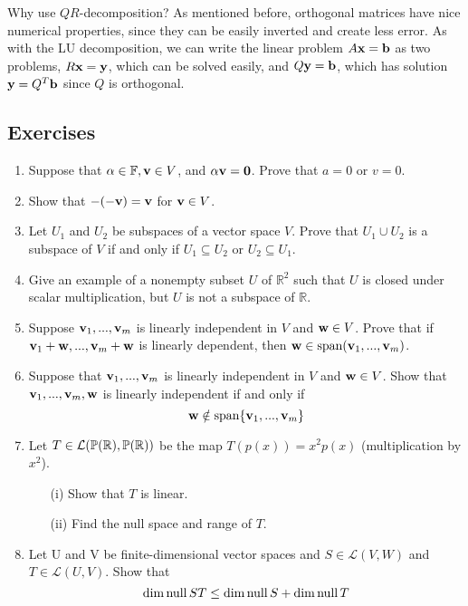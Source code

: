 \documentclass{article}
\begin{document}
Why use $QR$-decomposition? As mentioned before, orthogonal matrices have nice numerical properties, since they can be easily inverted and create less error. As with the LU decomposition, we can write the linear problem $A {\mathbf{x}} =\mathbf{b}$ as two problems, $R {\mathbf{x}} = {\mathbf{y}}$, which can be solved easily, and $Q {\mathbf{y}} = \mathbf{b}$, which has solution ${\mathbf{y}} = Q^T \mathbf{b}$ since $Q$ is orthogonal.

\subsection{Exercises}

\begin{enumerate}
\item Suppose that $\alpha\in{\mathbb{F}}, {\mathbf{v}}\in V$, and $\alpha {\mathbf{v}}={\mathbf{0}}$. Prove that $a=0$
or $v=0$.
\item Show that $-(-{\mathbf{v}})={\mathbf{v}}$ for ${\mathbf{v}}\in V$.
\item Let $U_1$ and $U_2$ be subspaces of a vector space $V$. Prove that $U_1 \cup U_2$ is a subspace of $V$ if and only if $U_1 \subseteq U_2$ or $U_2 \subseteq U_1$.
\item Give an example of a nonempty subset $U$ of $\mathbb{R}^{2}$ such that $U$ is closed under scalar
multiplication, but $U$ is not a subspace of $\mathbb{R}$.
 \item Suppose ${\mathbf{v}}_{1},...,{\mathbf{v}}_{m}$ is linearly independent in $V$
and ${\mathbf{w}}\in V$. Prove that if ${\mathbf{v}}_{1}+{\mathbf{w}},...,{\mathbf{v}}_{m}+{\mathbf{w}}$ is linearly dependent,
then ${\mathbf{w}}\in\text{span}({\mathbf{v}}_{1},...,{\mathbf{v}}_{m})$. 
\item Suppose that ${\mathbf{v}}_{1},...,{\mathbf{v}}_{m}$ is linearly independent
in $V$ and ${\mathbf{w}}\in V$. Show that ${\mathbf{v}}_{1},...,{\mathbf{v}}_{m},{\mathbf{w}}$ is linearly independent if and only if 
$${\mathbf{w}}\notin\text{span}\{{\mathbf{v}}_{1},...,{\mathbf{v}}_{m}\}$$
\item Let $T \in {\mathcal{L}}(\mathbb{P}({\mathbb{R}}),\mathbb{P}({\mathbb{R}}))$ be the map $T (p(x))= x^2 p(x)$ (multiplication by $x^2$). 
\begin{enumerate}
    \item[(i)] Show that $T$ is linear.
    \item[(ii)] Find the null space and range of $T$.
\end{enumerate}
\item \cite[3.B Exercise 22]{linalgright} Let U and V be finite-dimensional vector spaces and $S \in \mathcal{L}(V,W)$ and $T \in \mathcal{L}(U,V)$. Show that 
\begin{equation*}
    \dim \nullspace ST \leq \dim \nullspace S + \dim \nullspace T

\end{equation*}
\end{enumerate}
\end{document}

